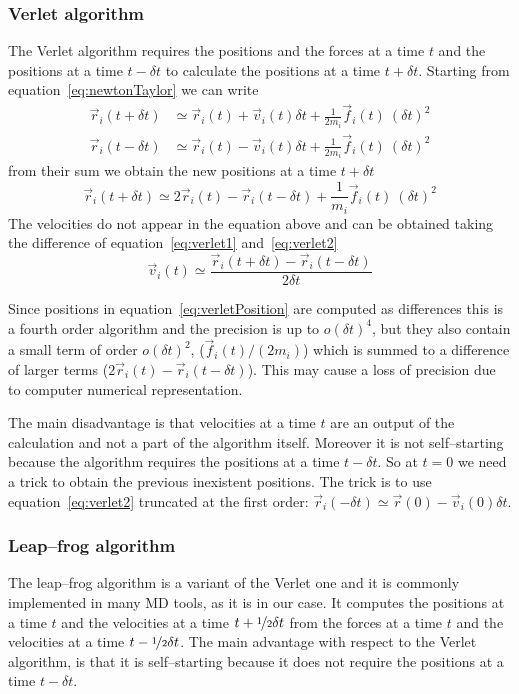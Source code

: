 \subsubsection{Verlet algorithm}
The Verlet algorithm requires the positions and the forces at a time $t$ and the positions at a time $t-\delta t$
to calculate the positions at a time $t+\delta t$. Starting from equation~\eqref{eq:newtonTaylor} we can write
\begin{align}
	\vec r_i(t+\delta t) &\simeq \vec r_i(t) + \vec v_i(t)\delta t + \frac{1}{2m_i}\vec f_i(t)\ (\delta t)^2
	\label{eq:verlet1} \\
	\vec r_i(t-\delta t) &\simeq \vec r_i(t) - \vec v_i(t)\delta t + \frac{1}{2m_i}\vec f_i(t)\ (\delta t)^2
	\label{eq:verlet2}
\end{align}
from their sum we obtain the new positions at a time $t+\delta t$
\begin{equation}
	\vec r_i(t+\delta t) \simeq 2 \vec r_i(t) - \vec r_i (t - \delta t) + \frac{1}{m_i}\vec f_i(t)\ (\delta t)^2
	\label{eq:verletPosition}
\end{equation}
The velocities do not appear in the equation above and can be obtained taking the difference of
equation~\eqref{eq:verlet1} and~\eqref{eq:verlet2}
\begin{equation*}
	\vec v_i(t) \simeq \frac{\vec r_i(t+\delta t) - \vec r_i(t-\delta t)}{2\delta t}
\end{equation*}

Since positions in equation~\eqref{eq:verletPosition} are computed as differences this is a fourth order
algorithm and the precision is up to $o(\delta t)^4$, but they also contain a small term of order
$o(\delta t)^2$, ($\vec f_i(t)/(2m_i)$) which is summed to a difference of larger terms
($2 \vec r_i(t) - \vec r_i (t - \delta t)$). This may cause a loss of precision due to computer numerical 
representation.

The main disadvantage is that velocities at a time $t$ are an output of the calculation and not a part of the
algorithm itself. Moreover it is not self--starting because the algorithm requires the positions at a time
$t-\delta t$. So at $t=0$ we need a trick to obtain the previous inexistent positions. The trick is to use
equation~\eqref{eq:verlet2} truncated at the first order: 
$\vec r_i(-\delta t) \simeq \vec r(0) - \vec v_i(0)\delta t$.

\subsubsection{Leap--frog algorithm}
The leap--frog algorithm is a variant of the Verlet one and it is commonly implemented in many \ac{MD} tools, as
it is in our case. It computes the positions at a time $t$ and the velocities at a time
$t+\nicefrac{1}{2}\delta t$ from the forces at a time $t$ and the velocities at a time
$t-\nicefrac{1}{2}\delta t$. The main advantage with respect to the Verlet algorithm, is that it is
self--starting because it does not require the positions at a time $t-\delta t$.

